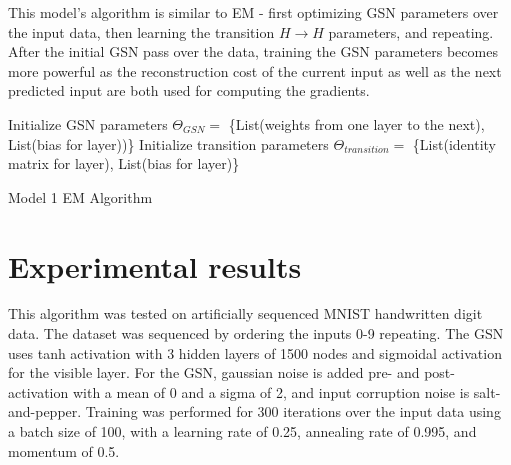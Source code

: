 This model's algorithm is similar to EM - first optimizing GSN parameters over the input data, then learning the transition \(H \rightarrow H\) parameters, and repeating. After the initial GSN pass over the data, training the GSN parameters becomes more powerful as the reconstruction cost of the current input as well as the next predicted input are both used for computing the gradients.

\begin{algorithm}[h!]
	Initialize GSN parameters \(\Theta_{GSN} = \) \{List(weights from one layer to the next), List(bias for layer))\}\;
	Initialize transition parameters \(\Theta_{transition}=\) \{List(identity matrix for layer), List(bias for layer)\} \;
	\caption{ Model 1 EM Algorithm }
\end{algorithm}

\section{Experimental results}

This algorithm was tested on artificially sequenced MNIST handwritten digit data. The dataset was sequenced by ordering the inputs 0-9 repeating. The GSN uses tanh activation with 3 hidden layers of 1500 nodes and sigmoidal activation for the visible layer. For the GSN, gaussian noise is added pre- and post-activation with a mean of 0 and a sigma of 2, and input corruption noise is salt-and-pepper. Training was performed for 300 iterations over the input data using a batch size of 100, with a learning rate of 0.25, annealing rate of 0.995, and momentum of 0.5.

